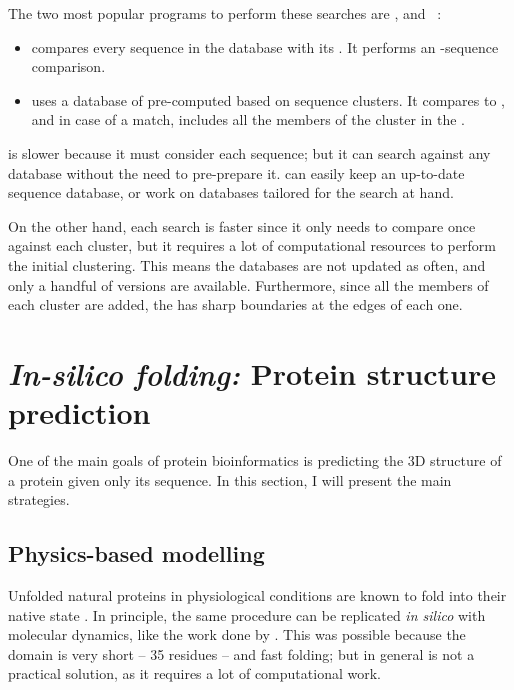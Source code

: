 The two most popular programs to perform these searches are \JackHMMER{} \citep{jh}, and \HHBlits~\citep{hhblits}:

\begin{itemize}
\item \JackHMMER{} compares every sequence in the database with its \HMM.
It performs an \HMM-sequence comparison.
\item \HHBlits{} uses a database of pre-computed \HMMs{} based on sequence clusters.
It compares \HMM{} to \HMM, and in case of a match, includes all the members of the cluster in the \MSA.
\end{itemize}

\JackHMMER{} is slower
because it must consider each sequence; but it can search against any database without the need to pre-prepare it.
\JackHMMER{} can easily keep an up-to-date sequence database, or work on databases tailored for the search at hand.

On the other hand, each \HHBlits{} search is faster since it only needs to compare once against each cluster, but it requires a lot of computational resources to perform the initial clustering.
This means the databases are not updated as often, and only a handful of versions are available.
Furthermore, since all the members of each cluster are added, the \MSA{} has sharp boundaries at the edges of each one.



\section[Protein structure prediction]{\emph{In-silico folding:} Protein structure prediction}
One of the main goals of protein bioinformatics is predicting the 3D structure of a protein given only its sequence.
In this section, I will present the main strategies.

\subsection{Physics-based modelling}
Unfolded natural proteins in physiological conditions are known to fold into their native state \citep{fold_graciously}.
In principle, the same procedure can be replicated \emph{in silico} with molecular dynamics, like the work done by \citet{physics_folding}.
This was possible because the domain is very short -- 35 residues -- and fast folding; but in general is not a practical solution, as it requires a lot of computational work.


